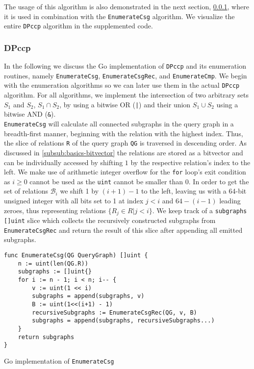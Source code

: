 The usage of this algorithm is also demonstrated in the next section, \ref{subsub:implementation-dpccp}, where it is used in combination with the \texttt{EnumerateCsg} algorithm. We visualize the entire \texttt{DPccp} algorithm in the supplemented code.

\subsubsection{DPccp}
\label{subsub:implementation-dpccp}

In the following we discuss the Go implementation of \texttt{DPccp} and its enumeration routines, namely \texttt{EnumerateCsg}, \texttt{EnumerateCsgRec}, and \texttt{EnumerateCmp}. We begin with the enumeration algorithms so we can later use them in the actual \texttt{DPccp} algorithm.
For all algorithms, we implement the intersection of two arbitrary sets $S_1$ and $S_2$, $S_1 \cap S_2$, by using a bitwise OR (\texttt{|}) and their union $S_1 \cup S_2$ using a bitwise AND (\texttt{\&}).\\

\texttt{EnumerateCsg} will calculate all connected subgraphs in the query graph in a breadth-first manner, beginning with the relation with the highest index. Thus, the slice of relations \texttt{R} of the query graph \texttt{QG} is traversed in descending order. As discussed in \ref{subsub:basics-bitvector} the relations are stored as a bitvector and can be individually accessed by shifting $1$ by the respective relation's index to the left. We make use of arithmetic integer overflow for the \texttt{for} loop's exit condition as $i \geq 0$ cannot be used as the \texttt{uint} cannot be smaller than 0. In order to get the set of relations $\mathcal{B}_i$ we shift 1 by $(i+1) - 1$ to the left, leaving us with a 64-bit unsigned integer with all bits set to 1 at index $j < i$ and $64 - (i-1)$ leading zeroes, thus representing relations $\{R_{j} \in R \vert j < i\}$. We keep track of a \texttt{subgraphs} \texttt{[]uint} slice which collects the recursively constructed subgraphs from \texttt{EnumerateCsgRec} and return the result of this slice after appending all emitted subgraphs.
\vspace{0.4cm}

\begin{algorithm}[H]
\begin{verbatim}
func EnumerateCsg(QG QueryGraph) []uint {
    n := uint(len(QG.R))
    subgraphs := []uint{}
    for i := n - 1; i < n; i-- {
        v := uint(1 << i)
        subgraphs = append(subgraphs, v)
        B := uint(1<<(i+1) - 1)
        recursiveSubgraphs := EnumerateCsgRec(QG, v, B)
        subgraphs = append(subgraphs, recursiveSubgraphs...)
    }
    return subgraphs
}
\end{verbatim}
\caption{Go implementation of \texttt{EnumerateCsg}}
\label{alg:enumeratecsg}
\end{algorithm}
\vspace{0.8cm}


